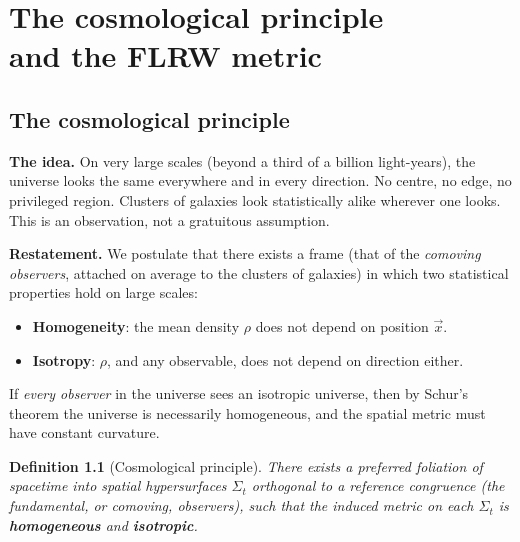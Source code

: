 \documentclass[11pt,a4paper,openany]{report}
\newtheorem{definition}[theorem]{Definition}
\begin{document}
\chapter[Cosmological principle and FLRW]{The cosmological principle\\ and the FLRW metric}
\label{chap:flrw}

\section{The cosmological principle}

\begin{tcolorbox}[plain]
\textbf{The idea.} On very large scales (beyond a third of a billion
light-years), the universe looks the same everywhere and in every direction.
No centre, no edge, no privileged region. Clusters of galaxies look
statistically alike wherever one looks. This is an observation, not a
gratuitous assumption.
\end{tcolorbox}

\begin{tcolorbox}[undergrad]
\textbf{Restatement.} We postulate that there exists a frame (that of the
\emph{comoving observers}, attached on average to the clusters of galaxies) in
which two statistical properties hold on large scales:
\begin{itemize}[topsep=2pt]
\item \textbf{Homogeneity}: the mean density $\rho$ does not depend on position
  $\vec{x}$.
\item \textbf{Isotropy}: $\rho$, and any observable, does not depend on
  direction either.
\end{itemize}

If \emph{every observer} in the universe sees an isotropic universe, then by
Schur's theorem the universe is necessarily homogeneous, and the spatial metric
must have constant curvature.
\end{tcolorbox}

\begin{definition}[Cosmological principle]
There exists a preferred foliation of spacetime into spatial hypersurfaces
$\Sigma_t$ orthogonal to a reference congruence (the \emph{fundamental}, or
\emph{comoving}, observers), such that the induced metric on each $\Sigma_t$ is
\textbf{homogeneous} and \textbf{isotropic}.
\end{definition}
\end{document}
